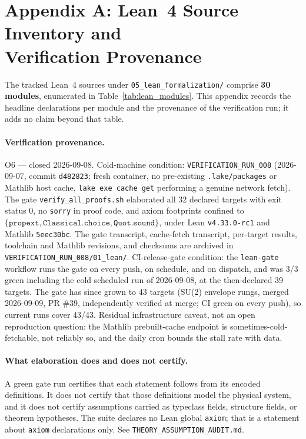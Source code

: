 \section*{Appendix A: Lean~4 Source Inventory and\\ Verification Provenance}
\label{app:lean_theorems}

The tracked Lean~4 sources under \texttt{05\_lean\_formalization/} comprise \textbf{30 modules},
enumerated in Table~\ref{tab:lean_modules}. This appendix records the headline declarations per
module and the provenance of the verification run; it adds no claim beyond that table.

\paragraph{Verification provenance.}
O6 --- closed 2026-09-08. Cold-machine condition: \texttt{VERIFICATION\_RUN\_008} (2026-09-07, commit \texttt{d482823}; fresh container, no pre-existing \texttt{.lake/packages} or Mathlib host cache, \texttt{lake exe cache get} performing a genuine network fetch). The gate \texttt{verify\_all\_proofs.sh} elaborated all 32 declared targets with exit status 0, no \texttt{sorry} in proof code, and axiom footprints confined to $\{\texttt{propext}, \texttt{Classical.choice}, \texttt{Quot.sound}\}$, under Lean \texttt{v4.33.0-rc1} and Mathlib \texttt{5eec30bc}. The gate transcript, cache-fetch transcript, per-target results, toolchain and Mathlib revisions, and checksums are archived in \texttt{VERIFICATION\_RUN\_008/01\_lean/}. CI-release-gate condition: the \texttt{lean-gate} workflow runs the gate on every push, on schedule, and on dispatch, and was 3/3 green including the cold scheduled run of 2026-09-08, at the then-declared 39 targets. The gate has since grown to 43 targets (SU(2) envelope rungs, merged 2026-09-09, PR \#39, independently verified at merge; CI green on every push), so current runs cover 43/43. Residual infrastructure caveat, not an open reproduction question: the Mathlib prebuilt-cache endpoint is sometimes-cold-fetchable, not reliably so, and the daily cron bounds the stall rate with data.

\paragraph{What elaboration does and does not certify.}
A green gate run certifies that each statement follows from its encoded definitions. It does not
certify that those definitions model the physical system, and it does not certify assumptions
carried as typeclass fields, structure fields, or theorem hypotheses. The suite declares no Lean
global \texttt{axiom}; that is a statement about \texttt{axiom} declarations only. See
\texttt{THEORY\_ASSUMPTION\_AUDIT.md}.

